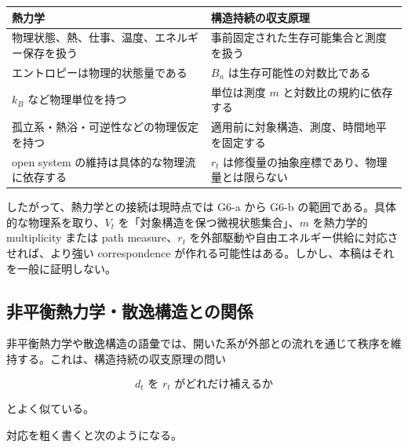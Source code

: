 \documentclass[12pt,a4paper]{article}
\begin{document}
{\def\LTcaptype{table} %
\begin{longtable}[]{@{}
  >{\raggedright\arraybackslash}p{}
  >{\raggedright\arraybackslash}p{}@{}}
\toprule\noalign{}
\begin{minipage}[b]{\linewidth}\raggedright
熱力学
\end{minipage} & \begin{minipage}[b]{\linewidth}\raggedright
構造持続の収支原理
\end{minipage} \\
\midrule\noalign{}
\endhead
\bottomrule\noalign{}
\endlastfoot
物理状態、熱、仕事、温度、エネルギー保存を扱う & 事前固定された生存可能集合と測度を扱う \\
エントロピーは物理的状態量である & \(B_n\) は生存可能性の対数比である \\
\(k_B\) など物理単位を持つ & 単位は測度 \(m\) と対数比の規約に依存する \\
孤立系・熱浴・可逆性などの物理仮定を持つ & 適用前に対象構造、測度、時間地平を固定する \\
open system の維持は具体的な物理流に依存する & \(r_t\) は修復量の抽象座標であり、物理量とは限らない \\
\end{longtable}
}

したがって、熱力学との接続は現時点では G6-a から G6-b の範囲である。具体的な物理系を取り、\(V_{t}\) を「対象構造を保つ微視状態集合」、\(m\) を熱力学的 multiplicity または path measure、\(r_{t}\) を外部駆動や自由エネルギー供給に対応させれば、より強い correspondence が作れる可能性はある。しかし、本稿はそれを一般に証明しない。

\subsection{非平衡熱力学・散逸構造との関係}\label{ux975eux5e73ux8861ux71b1ux529bux5b66ux6563ux9038ux69cbux9020ux3068ux306eux95a2ux4fc2}

非平衡熱力学や散逸構造の語彙では、開いた系が外部との流れを通じて秩序を維持する。これは、構造持続の収支原理の問い

\[
d_{t} \text{ を } r_{t} \text{ がどれだけ補えるか}
\]

とよく似ている。

対応を粗く書くと次のようになる。
\end{document}
